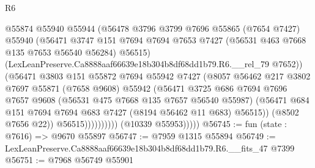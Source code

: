 \begin{lexlean}{R6}
\begin{coremodule}
                              @55874
                              @55940
                              @55944
                              (@56478
                                @3796
                                @3799
                                @7696
                                @55865
                                (@7654 @7427)
                                @55940
                                (@56471
                                  @3747
                                  @151
                                  @7694
                                  @7694
                                  @7653
                                  @7427
                                  (@56531 @463 @7668 @135 @7653 @56540 @56284)
                                  @56515)
                                (LexLeanPreserve.Ca8888aaf66639e18b304b8df68dd1b79.R6.__rel_79
                                  @7652))
                              (@56471
                                @3803
                                @151
                                @55872
                                @7694
                                @55942
                                @7427
                                (@8057
                                  @56462
                                  @217
                                  @3802
                                  @7697
                                  @55871
                                  (@7658 @9608)
                                  @55942
                                  (@56471
                                    @3725
                                    @686
                                    @7694
                                    @7696
                                    @7657
                                    @9608
                                    (@56531 @475 @7668 @135 @7657 @56540 @55987)
                                    (@56471
                                      @684
                                      @151
                                      @7694
                                      @7694
                                      @683
                                      @7427
                                      (@8194 @56462 @11 @683)
                                      @56515))
                                  (@8502 @7656 @22))
                                @56515))))))))))
            (@10339 @55953)))))
@56745 := fun (state : @7616) => @9670 @55897
@56747 := @7959 @1315 @55894
@56749 := LexLeanPreserve.Ca8888aaf66639e18b304b8df68dd1b79.R6.__fits_47 @7399
@56751 := @7968 @56749 @55901

\end{coremodule}
\end{lexlean}
